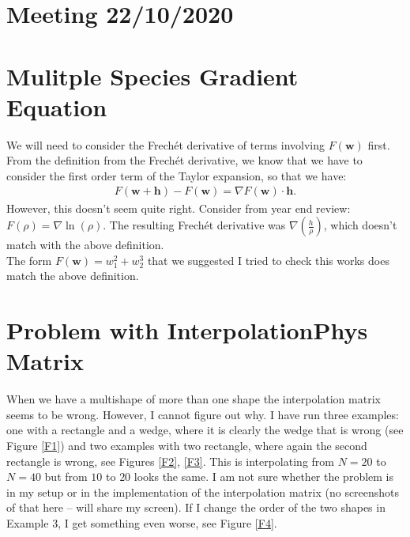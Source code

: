 \documentclass[11pt, a4paper]{article}
\theoremstyle{definition}
\newcommand{\w}{\mathbf{w}}
\newcommand{\h}{\mathbf{h}}
\begin{document}
	
\section*{Meeting 22/10/2020}

\section{Mulitple Species Gradient Equation}
We will need to consider the Frech\'et derivative of terms involving $F(\w)$ first.
From the definition from the Frech\'et derivative, we know that we have to consider the first order term of the Taylor expansion, so that we have:
\begin{align*}
F(\w + \h) - F(\w) = \nabla F(\w)\cdot \h.
\end{align*}
However, this doesn't seem quite right. Consider from year end review: $F(\rho) = \nabla \ln (\rho)$. The resulting Frech\'et derivative was $\nabla(\frac{h}{\rho})$, which doesn't match with the above definition. \\
The form $F(\w) = w_1^2 + w_2^3$ that we suggested I tried to check this works does match the above definition.	
	
\section{Problem with InterpolationPhys Matrix}
When we have a multishape of more than one shape the interpolation matrix seems to be wrong. However, I cannot figure out why. I have run three examples: one with a rectangle and a wedge, where it is clearly the wedge that is wrong (see Figure \ref{F1}) and two examples with two rectangle, where again the second rectangle is wrong, see Figures \ref{F2}, \ref{F3}. This is interpolating from $N = 20$ to $N = 40$ but from $10$ to $20$ looks the same. I am not sure whether the problem is in my setup or in the implementation of the interpolation matrix (no screenshots of that here -- will share my screen).
If I change the order of the two shapes in Example 3, I get something even worse, see Figure \ref{F4}.
\end{document}
